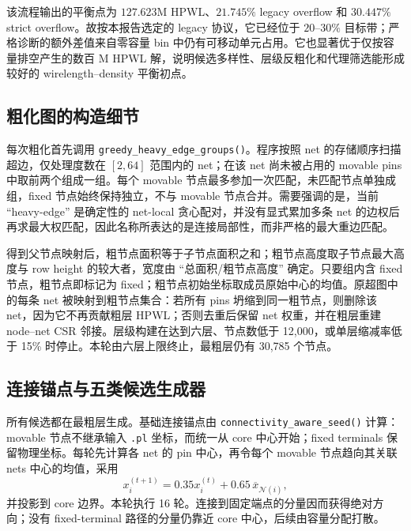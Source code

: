 \documentclass[11pt,a4paper]{ctexart}
\begin{document}
该流程输出的平衡点为 $127.623$M HPWL、$21.745\%$ legacy overflow 和 $30.447\%$ strict overflow。故按本报告选定的 legacy 协议，它已经位于 $20$--$30\%$ 目标带；严格诊断的额外差值来自零容量 bin 中仍有可移动单元占用。它也显著优于仅按容量排空产生的数百 M HPWL 解，说明候选多样性、层级反粗化和代理筛选能形成较好的 wirelength--density 平衡初点。

\subsection{粗化图的构造细节}
每次粗化首先调用 \texttt{greedy\_heavy\_edge\_groups()}。程序按照 net 的存储顺序扫描超边，仅处理度数在 $[2,64]$ 范围内的 net；在该 net 尚未被占用的 movable pins 中取前两个组成一组。每个 movable 节点最多参加一次匹配，未匹配节点单独成组，fixed 节点始终保持独立，不与 movable 节点合并。需要强调的是，当前 ``heavy-edge'' 是确定性的 net-local 贪心配对，并没有显式累加多条 net 的边权后再求最大权匹配，因此名称所表达的是连接局部性，而非严格的最大重边匹配。

得到父节点映射后，粗节点面积等于子节点面积之和；粗节点高度取子节点最大高度与 row height 的较大者，宽度由 ``总面积/粗节点高度'' 确定。只要组内含 fixed 节点，粗节点即标记为 fixed；粗节点初始坐标取成员原始中心的均值。原超图中的每条 net 被映射到粗节点集合：若所有 pins 坍缩到同一粗节点，则删除该 net，因为它不再贡献粗层 HPWL；否则去重后保留 net 权重，并在粗层重建 node--net CSR 邻接。层级构建在达到六层、节点数低于 12,000，或单层缩减率低于 15\% 时停止。本轮由六层上限终止，最粗层仍有 30,785 个节点。

\subsection{连接锚点与五类候选生成器}
所有候选都在最粗层生成。基础连接锚点由 \texttt{connectivity\_aware\_seed()} 计算：movable 节点不继承输入 \texttt{.pl} 坐标，而统一从 core 中心开始；fixed terminals 保留物理坐标。每轮先计算各 net 的 pin 中心，再令每个 movable 节点趋向其关联 nets 中心的均值，采用
\[
x_i^{(t+1)}=0.35x_i^{(t)}+0.65\,\overline{x}_{\mathcal N(i)},
\]
并投影到 core 边界。本轮执行 16 轮。连接到固定端点的分量因而获得绝对方向；没有 fixed-terminal 路径的分量仍靠近 core 中心，后续由容量分配打散。
\end{document}
